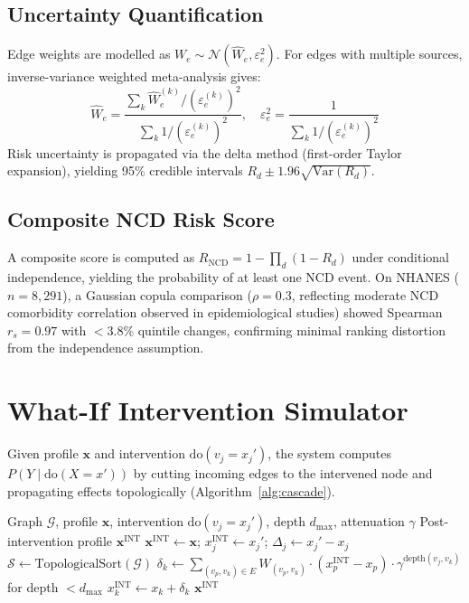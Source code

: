 \documentclass[runningheads]{llncs}
\begin{document}
\subsection{Uncertainty Quantification}\label{sec:uncert}

Edge weights are modelled as $W_e \sim \mathcal{N}(\hat{W}_e,
\varepsilon_e^2)$.
For edges with multiple sources, inverse-variance weighted
meta-analysis gives:
\begin{equation}\label{eq:meta}
\hat{W}_e = \frac{\sum_k \hat{W}_e^{(k)} / (\varepsilon_e^{(k)})^2}
{\sum_k 1 / (\varepsilon_e^{(k)})^2}, \quad
\varepsilon_e^2 = \frac{1}{\sum_k 1 / (\varepsilon_e^{(k)})^2}
\end{equation}
Risk uncertainty is propagated via the delta method (first-order
Taylor expansion), yielding 95\% credible intervals
$R_d \pm 1.96\sqrt{\mathrm{Var}(R_d)}$.

\subsection{Composite NCD Risk Score}\label{sec:composite}

A composite score is computed as
$R_{\mathrm{NCD}} = 1 - \prod_{d} (1 - R_d)$
under conditional independence, yielding the probability of at least
one NCD event.
On NHANES ($n = 8{,}291$), a Gaussian copula comparison
($\rho = 0.3$, reflecting moderate NCD comorbidity correlation
observed in epidemiological studies) showed Spearman $r_s = 0.97$
with $<$3.8\% quintile changes, confirming minimal ranking
distortion from the independence assumption.

\section{What-If Intervention Simulator}\label{sec:whatif}

Given profile $\mathbf{x}$ and intervention
$\mathrm{do}(v_j = x_j')$, the system computes
$P(Y \mid \mathrm{do}(X = x'))$ by cutting incoming edges to the
intervened node and propagating effects topologically
(Algorithm~\ref{alg:cascade}).

\begin{algorithm}[t]
\caption{Topological Intervention Cascade}
\label{alg:cascade}
\begin{algorithmic}[1]
\REQUIRE Graph $\mathcal{G}$, profile $\mathbf{x}$, intervention
  $\mathrm{do}(v_j = x_j')$, depth $d_{\max}$, attenuation $\gamma$
\ENSURE Post-intervention profile $\mathbf{x}^{\mathrm{INT}}$
\STATE $\mathbf{x}^{\mathrm{INT}} \leftarrow \mathbf{x}$;
  $x_j^{\mathrm{INT}} \leftarrow x_j'$;
  $\Delta_j \leftarrow x_j' - x_j$
\STATE $\mathcal{S} \leftarrow \text{TopologicalSort}(\mathcal{G})$
  \STATE $\delta_k \leftarrow \sum_{(v_p, v_k) \in E} W_{(v_p,v_k)} \cdot (x_p^{\mathrm{INT}} - x_p) \cdot \gamma^{\text{depth}(v_j,v_k)}$ for depth $< d_{\max}$
  \STATE $x_k^{\mathrm{INT}} \leftarrow x_k + \delta_k$
\ENDFOR
\RETURN $\mathbf{x}^{\mathrm{INT}}$
\end{algorithmic}
\end{algorithm}
\end{document}
